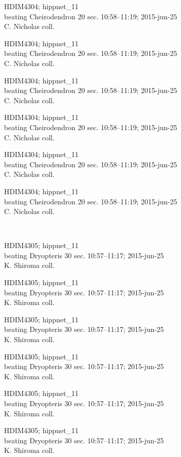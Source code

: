 \documentclass[2pt]{extarticle}
\begin{document}
\noindent
\parbox{0.16\textwidth}{\tiny \raggedright \rule[-0.3\baselineskip]{0pt}{10pt}HDIM4304; hippnet\_11\\ beating Cheirodendron 20 sec. 10:58--11:19; 2015-jun-25\\ C. Nicholas coll.}
\parbox{0.16\textwidth}{\tiny \raggedright \rule[-0.3\baselineskip]{0pt}{10pt}HDIM4304; hippnet\_11\\ beating Cheirodendron 20 sec. 10:58--11:19; 2015-jun-25\\ C. Nicholas coll.}
\parbox{0.16\textwidth}{\tiny \raggedright \rule[-0.3\baselineskip]{0pt}{10pt}HDIM4304; hippnet\_11\\ beating Cheirodendron 20 sec. 10:58--11:19; 2015-jun-25\\ C. Nicholas coll.}
\parbox{0.16\textwidth}{\tiny \raggedright \rule[-0.3\baselineskip]{0pt}{10pt}HDIM4304; hippnet\_11\\ beating Cheirodendron 20 sec. 10:58--11:19; 2015-jun-25\\ C. Nicholas coll.}
\parbox{0.16\textwidth}{\tiny \raggedright \rule[-0.3\baselineskip]{0pt}{10pt}HDIM4304; hippnet\_11\\ beating Cheirodendron 20 sec. 10:58--11:19; 2015-jun-25\\ C. Nicholas coll.}
\parbox{0.16\textwidth}{\tiny \raggedright \rule[-0.3\baselineskip]{0pt}{10pt}HDIM4304; hippnet\_11\\ beating Cheirodendron 20 sec. 10:58--11:19; 2015-jun-25\\ C. Nicholas coll.} \\ 
\vspace{0.001in} 

\noindent
\parbox{0.16\textwidth}{\tiny \raggedright \rule[-0.3\baselineskip]{0pt}{10pt}HDIM4305; hippnet\_11\\ beating Dryopteris 30 sec. 10:57--11:17; 2015-jun-25\\ K. Shiroma coll.}
\parbox{0.16\textwidth}{\tiny \raggedright \rule[-0.3\baselineskip]{0pt}{10pt}HDIM4305; hippnet\_11\\ beating Dryopteris 30 sec. 10:57--11:17; 2015-jun-25\\ K. Shiroma coll.}
\parbox{0.16\textwidth}{\tiny \raggedright \rule[-0.3\baselineskip]{0pt}{10pt}HDIM4305; hippnet\_11\\ beating Dryopteris 30 sec. 10:57--11:17; 2015-jun-25\\ K. Shiroma coll.}
\parbox{0.16\textwidth}{\tiny \raggedright \rule[-0.3\baselineskip]{0pt}{10pt}HDIM4305; hippnet\_11\\ beating Dryopteris 30 sec. 10:57--11:17; 2015-jun-25\\ K. Shiroma coll.}
\parbox{0.16\textwidth}{\tiny \raggedright \rule[-0.3\baselineskip]{0pt}{10pt}HDIM4305; hippnet\_11\\ beating Dryopteris 30 sec. 10:57--11:17; 2015-jun-25\\ K. Shiroma coll.}
\parbox{0.16\textwidth}{\tiny \raggedright \rule[-0.3\baselineskip]{0pt}{10pt}HDIM4305; hippnet\_11\\ beating Dryopteris 30 sec. 10:57--11:17; 2015-jun-25\\ K. Shiroma coll.} \\ 
\vspace{0.001in} 
\end{document}
